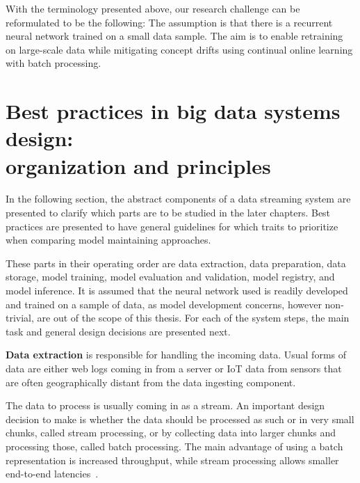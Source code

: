 With the terminology presented above, our research challenge can be reformulated to be the following: The assumption is that there is a recurrent neural network trained on a small data sample. The aim is to enable retraining on large-scale data while mitigating concept drifts using continual online learning with batch processing. 



\section[Best practices in big data systems design: organization and principles]{Best practices in big data systems design:\\ organization and principles}

In the following section, the abstract components of a data streaming system are presented to clarify which parts are to be studied in the later chapters. Best practices are presented to have general guidelines for which traits to prioritize when comparing model maintaining approaches.

These parts in their operating order are data extraction, data preparation, data storage, model training, model evaluation and validation, model registry, and model inference. It is assumed that the neural network used is readily developed and trained on a sample of data, as model development concerns, however non-trivial, are out of the scope of this thesis. For each of the system steps, the main task and general design decisions are presented next.

\textbf{Data extraction} is responsible for handling the incoming data. Usual forms of data are either web logs coming in from a server or IoT data from sensors that are often geographically distant from the data ingesting component.

The data to process is usually coming in as a stream. An important design decision to make is whether the data should be processed as such or in very small chunks, called stream processing, or by collecting data into larger chunks and processing those, called batch processing. The main advantage of using a batch representation is increased throughput, while stream processing allows smaller end-to-end latencies~\cite{mci/Feick2018}. 

